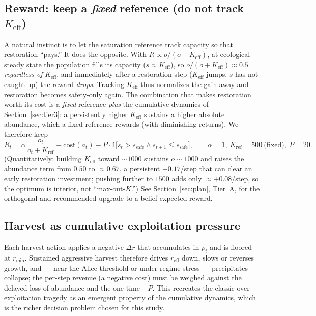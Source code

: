\documentclass[11pt]{article}
\newcommand{\reff}{r_{\mathrm{eff}}}
\newcommand{\Keff}{K_{\mathrm{eff}}}
\newcommand{\Kref}{K_{\mathrm{ref}}}
\newcommand{\rmin}{r_{\min}}
\newcommand{\sthr}{s_{\mathrm{safe}}}
\begin{document}
\subsection{Reward: keep a \emph{fixed} reference (do not track $\Keff$)}
\label{sec:rewardfix}
A natural instinct is to let the saturation reference track capacity so that
restoration ``pays.'' It does the opposite. With $R\propto o/(o+\Keff)$, at
ecological steady state the population fills its capacity ($s\approx\Keff$), so
$o/(o+\Keff)\approx 0.5$ \emph{regardless of} $\Keff$, and immediately after a
restoration step ($\Keff$ jumps, $s$ has not caught up) the reward \emph{drops}.
Tracking $\Keff$ thus normalizes the gain away and restoration becomes safety-only
again. The combination that makes restoration worth its cost is a \emph{fixed}
reference \emph{plus} the cumulative dynamics of Section~\ref{sec:tier3}: a
persistently higher $\Keff$ sustains a higher absolute abundance, which a fixed
reference rewards (with diminishing returns). We therefore keep
\begin{equation}
R_t=\alpha\,\frac{o_t}{o_t+\Kref}-\mathrm{cost}(a_t)
-P\cdot\mathbb{1}\big[s_t>\sthr\wedge s_{t+1}\le\sthr\big],
\qquad \alpha{=}1,\ \Kref{=}500\ \text{(fixed)},\ P{=}20.
\label{eq:reward3}
\end{equation}
(Quantitatively: building $\Keff$ toward $\sim\!1000$ sustains $o\sim\!1000$ and
raises the abundance term from $0.50$ to $\approx 0.67$, a persistent
$+0.17$/step that can clear an early restoration investment; pushing further to
$1500$ adds only $\approx +0.08$/step, so the optimum is interior, not
``max-out-$K$.'') See Section~\ref{sec:plan}, Tier~A, for the orthogonal and
recommended upgrade to a belief-expected reward.

\subsection{Harvest as cumulative exploitation pressure}
Each harvest action applies a negative $\Delta r$ that accumulates in $\rho_t$ and
is floored at $\rmin$. Sustained aggressive harvest therefore drives $\reff$ down,
slows or reverses growth, and --- near the Allee threshold or under regime stress
--- precipitates collapse; the per-step revenue (a negative cost) must be weighed
against the delayed loss of abundance and the one-time $-P$. This recreates the
classic over-exploitation tragedy as an emergent property of the cumulative
dynamics, which is the richer decision problem chosen for this study.
\end{document}
